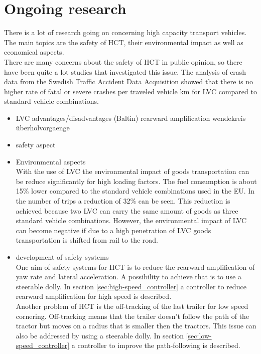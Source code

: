\documentclass[ExampleMasters.tex]{subfiles}
\begin{document}
\section{Ongoing research}
\label{sec:ongoing_research}
There is a lot of research going on concerning high capacity transport vehicles. The main topics are the safety of HCT, their environmental impact as well as economical aspects.\\

There are many concerns about the safety of HCT in public opinion, so there have been quite a lot studies that investigated this issue.
The analysis of crash data from the Swedish Traffic Accident Data Acquisition showed that there is no higher rate of fatal or severe crashes per traveled vehicle km for LVC compared to standard vehicle combinations. \cite{balint2013correlation}

\begin{itemize}
	\item LVC advantages/disadvantages (Baltin)
	\subitem rearward amplification
	\subitem wendekreis
	\subitem überholvorgaenge
	\item safety aspect 
	\item Environmental aspects \\
	With the use of LVC the environmental impact of goods transportation can be reduce significantly for high loading factors. The fuel consumption is about 15\% lower compared to the standard vehicle combinations used in the EU. In the number of trips a reduction of 32\% can be seen. This reduction is achieved because two LVC can carry the same amount of goods as three standard vehicle combinations.  \cite{backman2002improved}
	However, the environmental impact of LVC can become negative if due to a high penetration of LVC goods transportation is shifted from rail to the road. \cite{doll2009long}
	\item development of safety systems\\
	One aim of safety systems for HCT is to reduce the rearward amplification of yaw rate and lateral acceleration. A possibility to achieve that is to use a steerable dolly. In section \ref{sec:high-speed_controller} a controller to reduce rearward amplification for high speed is described.\\
	Another problem of HCT is the off-tracking of the last trailer for low speed cornering. Off-tracking means that the trailer doesn't follow the path of the tractor but moves on a radius that is smaller then the tractors. This issue can also be addressed by using a steerable dolly. In section \ref{sec:low-speed_controller} a controller to improve the path-following is described.
	
\end{itemize}
\end{document}
